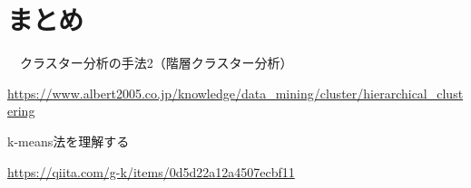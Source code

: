 \documentclass[dvipdfmx]{jsarticle}
\begin{document}
\section{まとめ}

\newpage
\begin{thebibliography}{10}
  　クラスター分析の手法2（階層クラスター分析）

  \url{https://www.albert2005.co.jp/knowledge/data_mining/cluster/hierarchical_clustering}

   k-means法を理解する

  \url{https://qiita.com/g-k/items/0d5d22a12a4507ecbf11}
\end{thebibliography}
\end{document}
